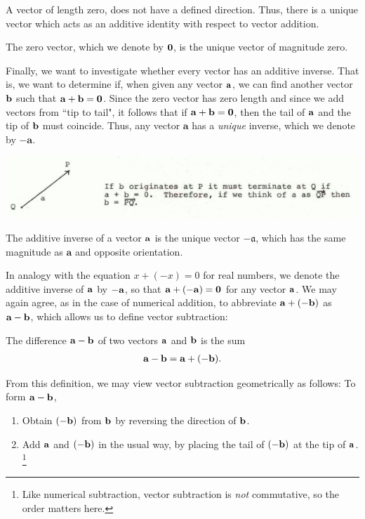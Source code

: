 \documentclass[12pt,letterpaper,reqno]{article}
\numberwithin{equation}{section}
\newcommand{\ti}[1]{\textit{#1}}
\begin{document}
A vector of length zero, does not have a defined direction. Thus, there is a unique vector which acts as an additive identity with respect to vector addition.

\begin{defn}
	The zero vector, which we denote by ${\bf 0}$, is the unique vector of magnitude zero.
\end{defn}

Finally, we want to investigate whether every vector has an additive inverse. That is, we want to determine if, when given any vector ${\bf a}$, we can find another vector ${\bf b}$ such that ${\bf a}+{\bf b}={\bf 0}$. Since the zero vector has zero length and since we add vectors from ``tip to tail", it follows that if ${\bf a}+{\bf b}={\bf 0}$, then the tail of ${\bf a}$ and the tip of ${\bf b}$ must coincide. Thus, any vector $\mathbf{a}$ has a \emph{unique} inverse, which we denote by $-\mathbf{a}$.   
\begin{center}
	\includegraphics[scale=0.5]{figures_mvc/a_plus_b_equals_zero}
\end{center} 
\begin{defn}
The additive inverse of a vector ${\bf a}$ is the unique vector $-\mathfrak{a}$, which has the same magnitude as $\mathbf{a}$ and opposite orientation.
\end{defn}
In analogy with the equation $x+(-x)=0$ for real numbers, we denote the additive inverse of ${\bf a}$ by $-{\bf a}$, so that ${\bf a}+(-{\bf a})={\bf 0}$ for any vector ${\bf a}$. We may again agree, as in the case of numerical addition, to abbreviate ${\bf a}+(-{\bf b})$ as ${\bf a}-{\bf b}$, which allows us to define vector subtraction:

\begin{defn}\label{def:vector_subtraction}
	The difference ${\bf a}-{\bf b}$ of two vectors ${\bf a}$ and ${\bf b}$ is the sum
	\begin{align*}
		{\bf a}-{\bf b}={\bf a}+(-{\bf b}).
	\end{align*}
\end{defn}
From this definition, we may view vector subtraction geometrically as follows: To form ${\bf a}-{\bf b}$,
\begin{enumerate}[(1)]
	\item Obtain $(-{\bf b})$ from ${\bf b}$ by reversing the direction of ${\bf b}$.
	\item Add ${\bf a}$ and $(-{\bf b})$ in the usual way, by placing the tail of $(-{\bf b})$ at the tip of ${\bf a}$. \footnote{Like numerical subtraction, vector subtraction is \ti{not} commutative, so the order matters here.}
\end{enumerate}
\end{document}
